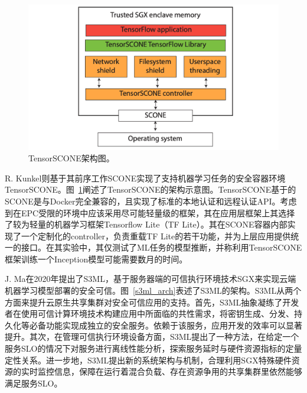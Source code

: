 \begin{figure}[h]
    \centerline{\includegraphics[width=\textwidth]{figures/tensorscone-arch.png}}
    \caption{TensorSCONE架构图。}
    \label{tensorscone_arch}
\end{figure}

R. Kunkel则基于其前序工作SCONE\parencite{arnautov2016scone}实现了支持机器学习任务的安全容器环境TensorSCONE。图~\ref{tensorscone_arch}阐述了TensorSCONE的架构示意图。TensorSCONE基于的SCONE是与Docker完全兼容的，且实现了标准的本地认证和远程认证API。考虑到在EPC受限的环境中应该采用尽可能轻量级的框架，其在应用层框架上其选择了较为轻量的机器学习框架Tensorflow Lite（TF Lite）。其在SCONE容器内部实现了一个定制化的controller，负责重载TF Lite的若干功能，并为上层应用提供统一的接口。在其实验中，其仅测试了ML任务的模型推断，并称利用TensorSCONE框架训练一个Inception模型可能需要数月的时间。

J. Ma在2020年提出了S3ML\parencite{ma2020s3ml}，基于服务器端的可信执行环境技术SGX来实现云端机器学习模型部署的安全可信。图~\ref{s3ml_arch}表述了S3ML的架构。S3ML从两个方面来提升云原生共享集群对安全可信应用的支持。首先，S3ML抽象凝练了开发者在使用可信计算环境技术构建应用中所面临的共性需求，将密钥生成、分发、持久化等必备功能实现成独立的安全服务。依赖于该服务，应用开发的效率可以显著提升。其次，在管理可信执行环境设备方面，S3ML提出了一种方法，在给定一个服务SLO的情况下对服务进行离线性能分析，探索服务延时与硬件资源指标的定量定性关系。进一步地，S3ML提出新的系统架构与机制，合理利用SGX特殊硬件资源的实时监控信息，保障在运行着混合负载、存在资源争用的共享集群里依然能够满足服务SLO。

